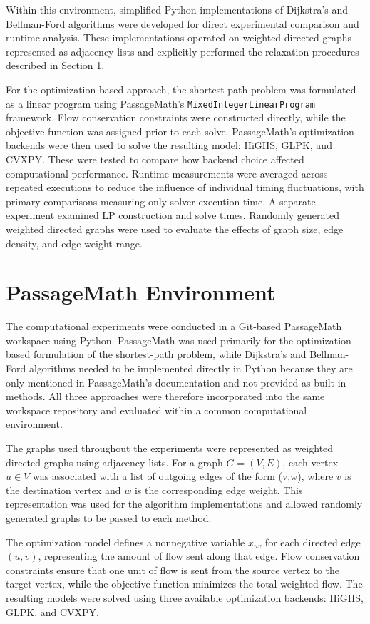 \documentclass[12pt]{report}
\begin{document}
Within this environment, simplified Python implementations of Dijkstra's and Bellman-Ford algorithms were developed for direct experimental comparison and runtime analysis. These implementations operated on weighted directed graphs represented as adjacency lists and explicitly performed the relaxation procedures described in Section 1.

For the optimization-based approach, the shortest-path problem was formulated as a linear program using PassageMath’s \texttt{MixedIntegerLinearProgram} framework. Flow conservation constraints were constructed directly, while the objective function was assigned prior to each solve. PassageMath's optimization backends were then used to solve the resulting model: HiGHS, GLPK, and CVXPY. These were tested to compare how backend choice affected computational performance. Runtime measurements were averaged across repeated executions to reduce the influence of individual timing fluctuations, with primary comparisons measuring only solver execution time. A separate experiment examined LP construction and solve times. Randomly generated weighted directed graphs were used to evaluate the effects of graph size, edge density, and edge-weight range.

\section{PassageMath Environment}

The computational experiments were conducted in a Git-based PassageMath workspace using Python. PassageMath was used primarily for the optimization-based formulation of the shortest-path problem, while Dijkstra's and Bellman-Ford algorithms needed to be implemented directly in Python because they are only mentioned in PassageMath's documentation and not provided as built-in methods. All three approaches were therefore incorporated into the same workspace repository and evaluated within a common computational environment.

The graphs used throughout the experiments were represented as weighted directed graphs using adjacency lists. For a graph $G=(V,E)$, each vertex $u \in V$ was associated with a list of outgoing edges of the form (v,w), where $v$ is the destination vertex and $w$ is the corresponding edge weight. This representation was used for the algorithm implementations and allowed randomly generated graphs to be passed to each method.

The optimization model defines a nonnegative variable $x_{uv}$ for each directed edge $(u,v)$, representing the amount of flow sent along that edge. Flow conservation constraints ensure that one unit of flow is sent from the source vertex to the target vertex, while the objective function minimizes the total weighted flow. The resulting models were solved using three available optimization backends: HiGHS, GLPK, and CVXPY.
\end{document}
